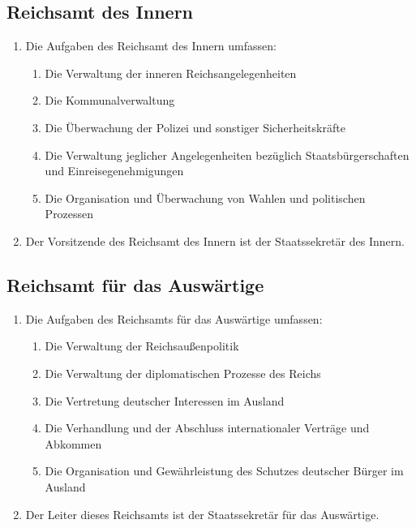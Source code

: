 \documentclass{article}
\begin{document}
\subsection{Reichsamt des Innern}
\begin{enumerate}[(1)]
    \item Die Aufgaben des Reichsamt des Innern umfassen:
    \begin{enumerate}[1.]
        \item Die Verwaltung der inneren Reichsangelegenheiten
        \item Die Kommunalverwaltung
        \item Die Überwachung der Polizei und sonstiger Sicherheitskräfte
        \item Die Verwaltung jeglicher Angelegenheiten bezüglich Staatsbürgerschaften und Einreisegenehmigungen
        \item Die Organisation und Überwachung von Wahlen und politischen Prozessen
    \end{enumerate}
    \item Der Vorsitzende des Reichsamt des Innern ist der Staatssekretär des Innern.
\end{enumerate}

\subsection{Reichsamt für das Auswärtige}
\begin{enumerate}[(1)]
    \item Die Aufgaben des Reichsamts für das Auswärtige umfassen:
    \begin{enumerate}[1.]
        \item Die Verwaltung der Reichsaußenpolitik
        \item Die Verwaltung der diplomatischen Prozesse des Reichs
        \item Die Vertretung deutscher Interessen im Ausland
        \item Die Verhandlung und der Abschluss internationaler Verträge und Abkommen
        \item Die Organisation und Gewährleistung des Schutzes deutscher Bürger im Ausland
    \end{enumerate}
    \item Der Leiter dieses Reichsamts ist der Staatssekretär für das Auswärtige.
\end{enumerate}
\end{document}
